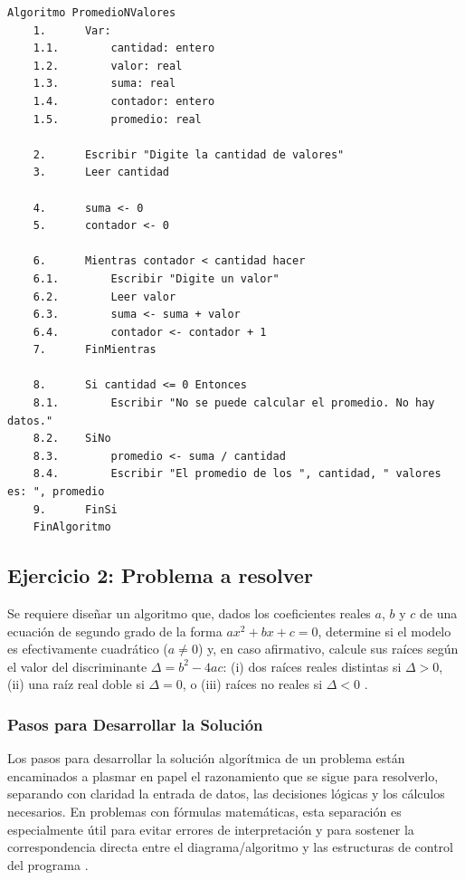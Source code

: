 \documentclass[12pt,twoside]{book}
\begin{document}
						\begin{lstlisting}[style=upsamStyle,caption={Cálculo del promedio de N valores},label={alg:promedioNValores}]
	Algoritmo PromedioNValores
	1.      Var:
	1.1.        cantidad: entero
	1.2.        valor: real
	1.3.        suma: real
	1.4.        contador: entero
	1.5.        promedio: real
	
	2.      Escribir "Digite la cantidad de valores"
	3.      Leer cantidad
	
	4.      suma <- 0
	5.      contador <- 0
	
	6.      Mientras contador < cantidad hacer
	6.1.        Escribir "Digite un valor"
	6.2.        Leer valor
	6.3.        suma <- suma + valor
	6.4.        contador <- contador + 1
	7.      FinMientras
	
	8.		Si cantidad <= 0 Entonces
	8.1.		Escribir "No se puede calcular el promedio. No hay datos."      
	8.2.	SiNo
	8.3.		promedio <- suma / cantidad
	8.4.      	Escribir "El promedio de los ", cantidad, " valores es: ", promedio
	9.		FinSi
	FinAlgoritmo \end{lstlisting}
				
				\subsection{Ejercicio 2: Problema a resolver}
					\noindent
					Se requiere diseñar un algoritmo que, dados los coeficientes reales $a$, $b$ y $c$ de una ecuación de segundo grado de la forma $ax^2+bx+c=0$, determine si el modelo es efectivamente cuadrático ($a\neq 0$) y, en caso afirmativo, calcule sus raíces según el valor del discriminante $\Delta=b^2-4ac$: (i) dos raíces reales distintas si $\Delta>0$, (ii) una raíz real doble si $\Delta=0$, o (iii) raíces no reales si $\Delta<0$ \cite{Joyanes2007Fundamentos,Gaddis2022Starting}.
				
					\subsubsection{Pasos para Desarrollar la Solución}
						\noindent
						Los pasos para desarrollar la solución algorítmica de un problema están encaminados a plasmar en papel el razonamiento que se sigue para resolverlo, separando con claridad la entrada de datos, las decisiones lógicas y los cálculos necesarios. En problemas con fórmulas matemáticas, esta separación es especialmente útil para evitar errores de interpretación y para sostener la correspondencia directa entre el diagrama/algoritmo y las estructuras de control del programa \cite{Hooshyar2015Flowchart,Farrell2018Programming}.
						
\end{document}
